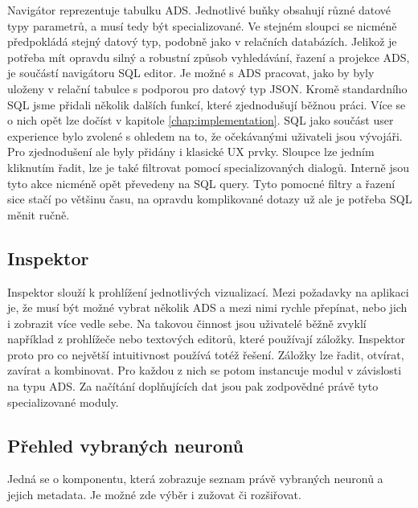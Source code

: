 Navigátor reprezentuje tabulku ADS. Jednotlivé buňky obsahují různé datové typy parametrů, a musí tedy být specializované. Ve stejném sloupci se nicméně předpokládá stejný datový typ, podobně jako v relačních databázích. Jelikož je potřeba mít opravdu silný a robustní způsob vyhledávání, řazení a projekce ADS, je součástí navigátoru SQL editor. Je možné s ADS pracovat, jako by byly uloženy v relační tabulce s podporou pro datový typ JSON. Kromě standardního SQL jsme přidali několik dalších funkcí, které zjednodušují běžnou práci. Více se o nich opět lze dočíst v kapitole \ref{chap:implementation}. SQL jako součást user experience bylo zvolené s ohledem na to, že očekávanými uživateli jsou vývojáři. Pro zjednodušení ale byly přidány i klasické UX prvky. Sloupce lze jedním kliknutím řadit, lze je také filtrovat pomocí specializovaných dialogů. Interně jsou tyto akce nicméně opět převedeny na SQL query. Tyto pomocné filtry a řazení sice stačí po většinu času, na opravdu komplikované dotazy už ale je potřeba SQL měnit ručně.

\subsection{Inspektor}

Inspektor slouží k prohlížení jednotlivých vizualizací. Mezi požadavky na aplikaci je, že musí být možné vybrat několik ADS a mezi nimi rychle přepínat, nebo jich i zobrazit více vedle sebe. Na takovou činnost jsou uživatelé běžně zvyklí například z prohlížeče nebo textových editorů, které používají záložky. Inspektor proto pro co největší intuitivnost používá totéž řešení. Záložky lze řadit, otvírat, zavírat a kombinovat. Pro každou z nich se potom instancuje modul v závislosti na typu ADS. Za načítání doplňujících dat jsou pak zodpovědné právě tyto specializované moduly. 

\subsection{Přehled vybraných neuronů}

Jedná se o komponentu, která zobrazuje seznam právě vybraných neuronů a jejich metadata. Je možné zde výběr i zužovat či rozšiřovat.

